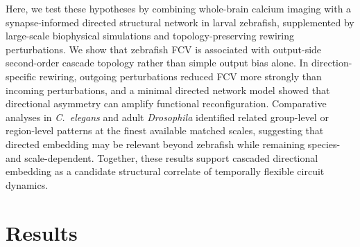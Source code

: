 \documentclass[9pt,twocolumn,twoside]{pnas-new}
\begin{document}
Here, we test these hypotheses by combining whole-brain calcium imaging with a synapse-informed directed structural network in larval zebrafish, supplemented by large-scale biophysical simulations and topology-preserving rewiring perturbations.
We show that zebrafish FCV is associated with output-side second-order cascade topology rather than simple output bias alone.
In direction-specific rewiring, outgoing perturbations reduced FCV more strongly than incoming perturbations, and a minimal directed network model showed that directional asymmetry can amplify functional reconfiguration.
Comparative analyses in \textit{C.~elegans} and adult \textit{Drosophila} identified related group-level or region-level patterns at the finest available matched scales, suggesting that directed embedding may be relevant beyond zebrafish while remaining species- and scale-dependent. Together, these results support cascaded directional embedding as a candidate structural correlate of temporally flexible circuit dynamics.


\section*{Results}
\end{document}
